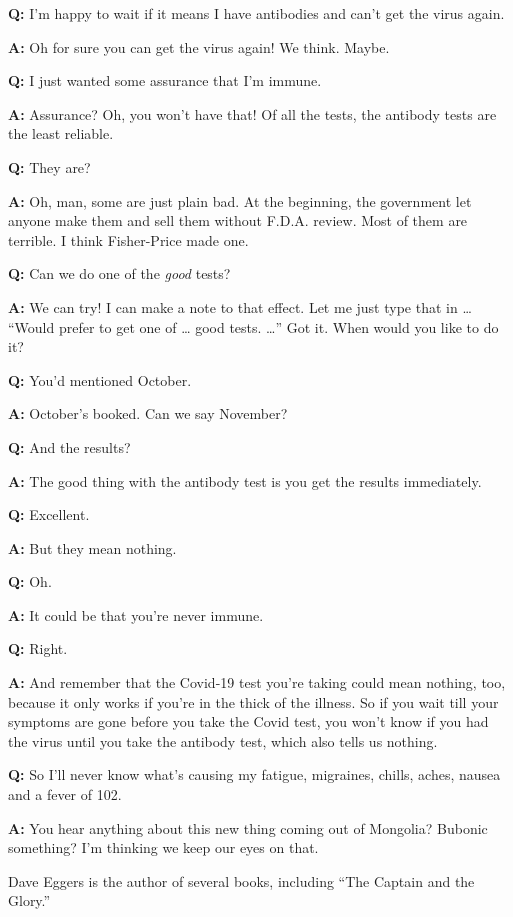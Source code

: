 \textbf{Q:} I'm happy to wait if it means I have antibodies and can't
get the virus again.

\textbf{A:} Oh for sure you can get the virus again! We think. Maybe.

\textbf{Q:} I just wanted some assurance that I'm immune.

\textbf{A:} Assurance? Oh, you won't have that! Of all the tests, the
antibody tests are the least reliable.

\textbf{Q:} They are?

\textbf{A:} Oh, man, some are just plain bad. At the beginning, the
government let anyone make them and sell them without F.D.A. review.
Most of them are terrible. I think Fisher-Price made one.

\textbf{Q:} Can we do one of the \emph{good} tests?

\textbf{A:} We can try! I can make a note to that effect. Let me just
type that in \ldots{} ``Would prefer to get one of \ldots{} good tests.
\ldots{}'' Got it. When would you like to do it?

\textbf{Q:} You'd mentioned October.

\textbf{A:} October's booked. Can we say November?

\textbf{Q:} And the results?

\textbf{A:} The good thing with the antibody test is you get the results
immediately.

\textbf{Q:} Excellent.

\textbf{A:} But they mean nothing.

\textbf{Q:} Oh.

\textbf{A:} It could be that you're never immune.

\textbf{Q:} Right.

\textbf{A:} And remember that the Covid-19 test you're taking could mean
nothing, too, because it only works if you're in the thick of the
illness. So if you wait till your symptoms are gone before you take the
Covid test, you won't know if you had the virus until you take the
antibody test, which also tells us nothing.

\textbf{Q:} So I'll never know what's causing my fatigue, migraines,
chills, aches, nausea and a fever of 102.

\textbf{A:} You hear anything about this new thing coming out of
Mongolia? Bubonic something? I'm thinking we keep our eyes on that.

Dave Eggers is the author of several books, including ``The Captain and
the Glory.''

